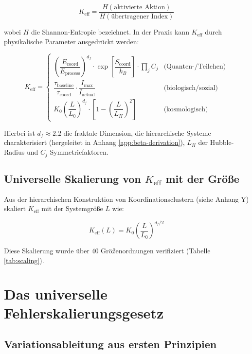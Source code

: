 \documentclass[12pt,a4paper]{article}
\theoremstyle{remark}
\newcommand{\Keff}{K_{\mathrm{eff}}}
\newcommand{\df}{d_{\!f}}
\begin{document}
	\begin{equation}
		\Keff = \frac{H(\text{aktivierte Aktion})}{H(\text{übertragener Index})}
		\label{eq:keff-def}
	\end{equation}
	
	wobei $H$ die Shannon-Entropie bezeichnet. In der Praxis kann $\Keff$ durch physikalische Parameter ausgedrückt werden:
	
	\begin{equation}
		\Keff = 
		\begin{cases}
			\left(\dfrac{E_{\text{coord}}}{E_{\text{process}}}\right)^{\df} \cdot \exp\left[\dfrac{S_{\text{coord}}}{k_B}\right] \cdot \prod_j C_j & \text{(Quanten-/Teilchen)} \\[1em]
			\dfrac{\tau_{\text{baseline}}}{\tau_{\text{coord}}} \cdot \dfrac{I_{\text{max}}}{I_{\text{actual}}} & \text{(biologisch/sozial)} \\[1em]
			K_0 \left(\dfrac{L}{L_0}\right)^{\df} \cdot \left[1 - \left(\dfrac{L}{L_H}\right)^2\right] & \text{(kosmologisch)}
		\end{cases}
		\label{eq:keff-cases}
	\end{equation}
	
	Hierbei ist $\df \approx 2.2$ die fraktale Dimension, die hierarchische Systeme charakterisiert (hergeleitet in Anhang \ref{app:beta-derivation}), $L_H$ der Hubble-Radius und $C_j$ Symmetriefaktoren.
	
	\subsection{Universelle Skalierung von $\Keff$ mit der Größe}
	
	Aus der hierarchischen Konstruktion von Koordinationsclustern (siehe Anhang Y) skaliert $\Keff$ mit der Systemgröße $L$ wie:
	
	\begin{equation}
		\Keff(L) = K_0 \left(\frac{L}{L_0}\right)^{\df/2}
		\label{eq:keff-scaling}
	\end{equation}
	
	Diese Skalierung wurde über 40 Größenordnungen verifiziert (Tabelle \ref{tab:scaling}).
	
	\section{Das universelle Fehlerskalierungsgesetz}
	\label{sec:error-law}
	
	\subsection{Variationsableitung aus ersten Prinzipien}
	
\end{document}
